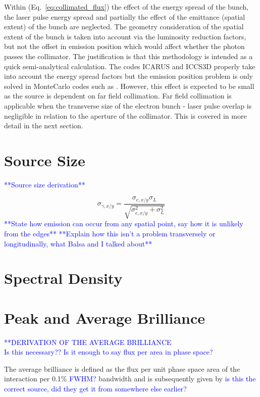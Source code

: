 \documentclass[../main.tex]{subfiles}
\begin{document}
Within (Eq.~\ref{eq:collimated_flux}) the effect of the energy spread of the bunch, the laser pulse energy spread and partially the effect of the emittance (spatial extent) of the bunch are neglected. The geometry consideration of the spatial extent of the bunch is taken into account via the luminosity reduction factors, but not the offset in emission position which would affect whether the photon passes the collimator. The justification is that this methodology is intended as a quick semi-analytical calculation. The codes \textsc{ICARUS} and \textsc{ICCS3D} \cite{krafft2016laser,ranjan2018simulation} properly take into account the energy spread factors but the emission position problem is only solved in MonteCarlo codes such as  \cite{chen1995cain}. However, this effect is expected to be small as the source is dependent on far field collimation. Far field collimation is applicable when the transverse size of the electron bunch - laser pulse overlap is negligible in relation to the aperture of the collimator. This is covered in more detail in the next section.  

\section{Source Size}
\textcolor{blue}{**Source size derivation**}

\begin{equation}
\sigma_{\gamma,x/y} = \frac{\sigma_{e,x/y}\sigma_{L}}{\sqrt{\sigma_{e,x/y}^{2}+\sigma_{L}^{2}}}
\label{eq:source_size}
\end{equation}
\textcolor{blue}{**State how emission can occur from any spatial point, say how it is unlikely from the edges**}
\textcolor{blue}{**Explain how this isn't a problem transversely or longitudinally, what Balsa and I talked about**}

\section{Spectral Density}

\section{Peak and Average Brilliance}
\textcolor{blue}{**DERIVATION OF THE AVERAGE BRILLIANCE \\ Is this necessary?? Is it enough to say flux per area in phase space?}

The average brilliance is defined as the flux per unit phase space area of the interaction per 0.1\% \textcolor{blue}{FWHM?} bandwidth and is subsequently given by \cite{krafft2010compton,deitrick2018high} \textcolor{blue}{is this the correct source, did they get it from somewhere else earlier?}
\end{document}
